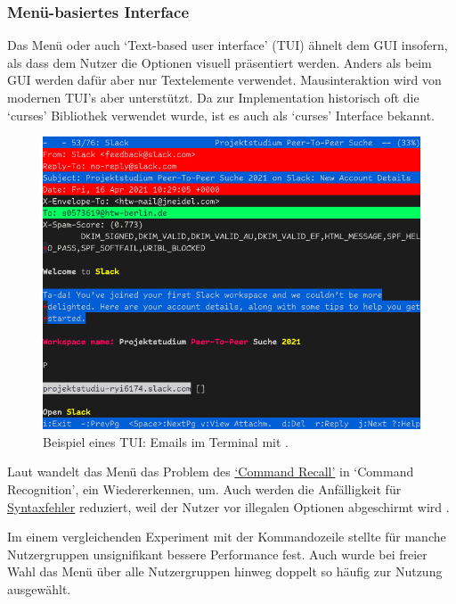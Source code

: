 \documentclass[oneside,bibliography=totocnumbered,BCOR=5mm]{scrbook}
\begin{document}
\subsubsection{Menü-basiertes Interface}
\label{sec:def-menu}

Das Menü oder auch `Text-based user interface' (TUI) ähnelt dem GUI insofern,
als dass dem Nutzer die Optionen visuell präsentiert werden. Anders als beim GUI
werden dafür aber nur Textelemente verwendet. Mausinteraktion wird von modernen
TUI's aber unterstützt. Da zur Implementation historisch oft die `curses'
Bibliothek verwendet wurde, ist es auch als `curses' Interface bekannt.

\medskip

\begin{figure}[H]
  \centering
  \includegraphics[scale=.47]{menu-example.png}
  \caption{Beispiel eines TUI: Emails im Terminal mit .}
  \label{fig:menu-example}
\end{figure}

Laut \textcite{Paap_1988} wandelt das Menü das Problem des
\hyperref[prob:cr]{`Command Recall'} in `Command
Recognition', ein Wiedererkennen, um. Auch werden die Anfälligkeit für
\hyperref[prob:ss]{Syntaxfehler} reduziert, weil der Nutzer vor
illegalen Optionen abgeschirmt wird \parencite{Kantorowitz_1989}.

Im einem vergleichenden Experiment mit der Kommandozeile stellte
\textcite{Westerman_1997} für manche Nutzergruppen unsignifikant bessere Performance
fest. Auch wurde bei freier Wahl das Menü über alle Nutzergruppen hinweg doppelt
so häufig zur Nutzung ausgewählt.
\end{document}
